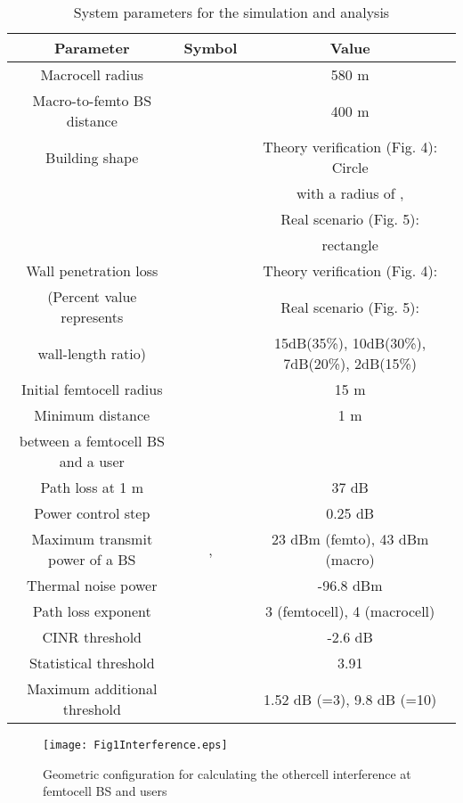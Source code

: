 \documentclass[draftclsnofoot,12pt,onecolumn]{IEEEtran}
\begin{document}
\newpage
\begin{table}
\caption{System parameters for the simulation and analysis}
\label{table_1}
\begin{center}
\begin{tabular}{c|c|c}
  \hline
  Parameter & Symbol & Value \\ \hline \hline
  Macrocell radius &  & 580 m \\ \hline
  Macro-to-femto BS distance &  & 400 m \\ \hline
  Building shape & & Theory verification (Fig. 4): Circle \\
  &&with a radius of ,\\
  & & Real scenario (Fig. 5): \\
  && rectangle \\ \hline
  Wall penetration loss && Theory verification (Fig. 4):\\
  (Percent value represents &&Real scenario (Fig. 5): \\
  wall-length ratio) &&15dB(35\%), 10dB(30\%), 7dB(20\%), 2dB(15\%)\\ \hline
  Initial femtocell radius &  & 15 m \\ \hline
Minimum distance &  & 1 m \\
  between a femtocell BS and a user  & \\ \hline
  Path loss at 1 m &  & 37 dB \\ \hline
  Power control step &  & 0.25 dB \\ \hline
  Maximum transmit power of a BS & ,  & 23 dBm (femto), 43 dBm (macro) \\ \hline
Thermal noise power &  & -96.8 dBm \\ \hline
  Path loss exponent &  & 3 (femtocell), 4 (macrocell) \\ \hline
  CINR threshold &  & -2.6 dB \\ \hline
  Statistical threshold &  & 3.91 \\ \hline
  Maximum additional threshold &  & 1.52 dB (=3), 9.8 dB (=10)\\ \hline
\end{tabular}
\end{center}
\end{table}
\newpage


\begin{figure}
\begin{center}
   \texttt{[image: Fig1Interference.eps]}
    \caption{Geometric configuration for calculating the othercell interference at femtocell BS and users}
    \label{fig:Interference}
\end{center}
\end{figure}
\end{document}

